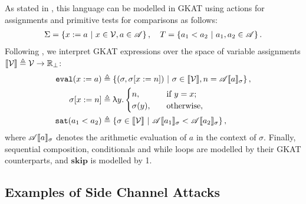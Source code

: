 As stated in \cite{GKAT}, this language can be modelled in GKAT using actions for assignments and primitive tests for comparisons as follows:
\begin{align}
\Sigma=\left\{x:=a\ |\ x\in \mathcal{V}, a\in \mathscr{A}\right\}, \quad T=\left\{a_1 < a_2\ |\ a_1,a_2\in \mathscr{A}\right\}.
\end{align}
Following \cite{GKAT}, we interpret GKAT expressions over the space of variable assignments $\llbracket \mathcal{V}\rrbracket\triangleq\mathcal{V} \rightarrow\mathbb{R}_\perp$:
\begin{align*}
\eval(x:=a)&\triangleq \set{(\sigma, \sigma[x:=n])\ |\  \sigma \in \semantics{\Variable}, n=\mathscr{A}\semantics{a}_\sigma},\\
\sigma[x:=n]&\triangleq \uplambda y \ldotp 
	\begin{cases}
		n, \quad &\text{if $y=x$};\\
		\sigma(y), \quad&\text{otherwise},
	\end{cases}\\
\sat(a_1<a_2)&\triangleq \set{\sigma \in \semantics{\Variable}\ |\ \mathscr{A}\semantics{a_1}_{\sigma} < \mathscr{A}\semantics{a_2}_{\sigma}},
\end{align*}
where $\mathscr{A}\llbracket a\rrbracket_\sigma$ denotes the arithmetic evaluation of $a$ in the context of $\sigma$. Finally, sequential composition, conditionals and while loops are modelled by their GKAT counterparts, and $\mathbf{skip}$ is modelled by 1.



\subsection{Examples of Side Channel Attacks}

